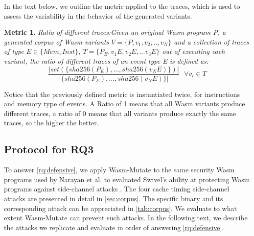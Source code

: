 \documentclass[sigplan,screen]{acmart}
\newcommand*\badge[1]{ \colorbox{red}{\color{white}#1}}
\newcommand{\tool}{{\sc Wasm-Mutate}\xspace}
\newcommand{\wasm}{Wasm\xspace}
\newtheorem{metric}{Metric}
\newcommand*\step[1]{
\noindent\tikz[baseline=(char.base)]{
        \node[shape=circle,text=black,draw=black, fill=white,inner sep=1.2pt] (char) {#1};}}
\newcommand{\todo}[1]{%
\refstepcounter{todo}
\noindent\textbf{\badge{TODO}} {\color{red}#1}
\addcontentsline{td}{todo}
{\color{red}\thesection.\thetodo\xspace #1}}
\begin{document}
In the text below, we outline the metric applied to the traces, which is used to assess the variability in the behavior of the generated variants.

\begin{metric}{Ratio of different traces:}\label{metric:mem:sha}
Given an original \wasm program P, a generated corpus of \wasm variants $V=\{P,v_1, v_2, .., v_N\}$ and a collection of traces of type $E\in \{Mem, Inst\}$, $T=\{P_E, v_1E, v_2E, ...v_3E\}$ out of executing each variant, the ratio of different traces of an event type E is defined as:
$$
    \frac{| set(\{ sha256({P_E}),..., sha256(v_NE) \})|}{| \{ sha256(P_E),..., sha256(v_NE) \}|}\text{ } \forall v_i \in T
$$

\end{metric}

Notice that the previously defined metric is instantiated twice, for instructions and memory type of events.
A Ratio of 1 means that all \wasm variants produce different traces, a ratio of 0 means that all variants produce exactly the same traces, so the higher the better.



\subsection{Protocol for RQ3}
\label{protocol:rq3}

\newcommand{\poct}{\emph{Cache timing POC}\xspace}
\newcommand{\pocd}{\emph{Differential computing POC}\xspace}
\newcommand{\pocp}{\emph{Port contention POC}\xspace}

To answer \ref{rq:defensive}, we apply \tool to the same security \wasm programs used by Narayan et al. to evaluated Swivel's ability at protecting \wasm programs against side-channel attacks \cite{Swivel}. 
The four cache timing side-channel attacks are presented in detail in \autoref{sec:corpus}. 
The specific binary and its corresponding attack can be appreciated in \autoref{tab:corpus}.
We evaluate to what extent \tool can prevent such attacks.
In the following text, we describe the attacks we replicate and evaluate in order of answering \ref{rq:defensive}.
\end{document}
